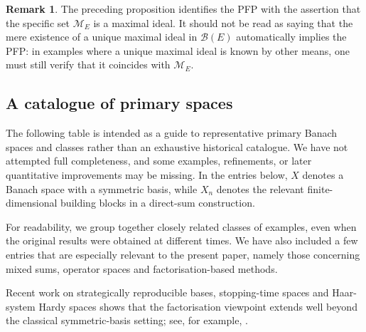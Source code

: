 \documentclass[11pt]{amsart}
\theoremstyle{plain}
\theoremstyle{definition}
\newtheorem{remark}[theorem]{Remark}
\numberwithin{equation}{section}
\newcommand{\Bop}{\mathcal{B}}
\begin{document}
\begin{remark}
    The preceding proposition identifies the PFP with the assertion that the specific set $\mathcal M_E$ is a maximal ideal. It should not be read as saying that the mere existence of a unique maximal ideal in $\Bop(E)$ automatically implies the PFP: in examples where a unique maximal ideal is known by other means, one must still verify that it coincides with $\mathcal M_E$.
\end{remark}

\subsection{A catalogue of primary spaces}

The following table is intended as a guide to representative primary Banach spaces and classes rather than an exhaustive historical catalogue. We have not attempted full completeness, and some examples, refinements, or later quantitative improvements may be missing. In the entries below, $X$ denotes a Banach space with a symmetric basis, while $X_n$ denotes the relevant finite-dimensional building blocks in a direct-sum construction.

For readability, we group together closely related classes of examples, even when the original results were obtained at different times. We have also included a few entries that are especially relevant to the present paper, namely those concerning mixed sums, operator spaces and factorisation-based methods.

Recent work on strategically reproducible bases, stopping-time spaces and Haar-system Hardy spaces shows that the factorisation viewpoint extends well beyond the classical sym\-met\-ric-basis setting; see, for example, \cite{KaniaLechner2022,LechnerSpeckhofer2025}.
\end{document}
